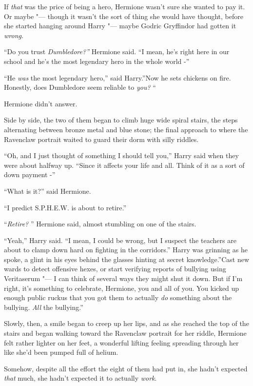 If \emph{that} was the price of being a hero, Hermione wasn't sure she
wanted to pay it. Or maybe "--- though it wasn't the sort of thing she
would have thought, before she started hanging around Harry "--- maybe
Godric Gryffindor had gotten it \emph{wrong}.

``Do you trust \emph{Dumbledore?''} Hermione said. ``I mean, he's right
here in our school and he's the most legendary hero in the whole world
-''

``He \emph{was} the most legendary hero,'' said Harry.''Now he sets
chickens on fire. Honestly, does Dumbledore seem reliable to \emph{you?}
``

Hermione didn't answer.

Side by side, the two of them began to climb huge wide spiral stairs,
the steps alternating between bronze metal and blue stone; the final
approach to where the Ravenclaw portrait waited to guard their dorm with
silly riddles.

``Oh, and I just thought of something I should tell you,'' Harry said
when they were about halfway up. ``Since it affects your life and all.
Think of it as a sort of down payment -''

``What is it?'' said Hermione.

``I predict S.P.H.E.W. is about to retire.''

``\emph{Retire?} '' Hermione said, almost stumbling on one of the stairs.

``Yeah,'' Harry said. ``I mean, I could be wrong, but I suspect the
teachers are about to clamp down hard on fighting in the corridors.''
Harry was grinning as he spoke, a glint in his eyes behind the glasses
hinting at secret knowledge.''Cast new wards to detect offensive hexes,
or start verifying reports of bullying using Veritaserum "--- I can think
of several ways they might shut it down. But if I'm right, it's
something to celebrate, Hermione, you and all of you. You kicked up
enough public ruckus that you got them to actually \emph{do} something
about the bullying. \emph{All} the bullying.''

Slowly, then, a smile began to creep up her lips, and as she reached the
top of the stairs and began walking toward the Ravenclaw portrait for
her riddle, Hermione felt rather lighter on her feet, a wonderful
lifting feeling spreading through her like she'd been pumped full of
helium.

Somehow, despite all the effort the eight of them had put in, she hadn't
expected \emph{that} much, she hadn't expected it to actually
\emph{work}.

